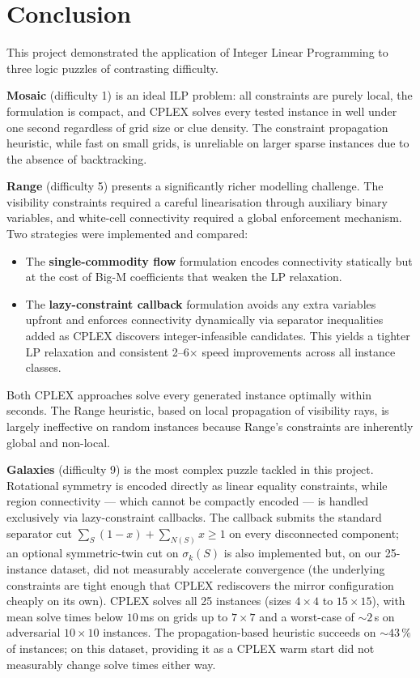 \section{Conclusion}
\label{sec:conclusion}

This project demonstrated the application of Integer Linear Programming to three logic puzzles of contrasting difficulty.

\textbf{Mosaic} (difficulty 1) is an ideal ILP problem: all constraints are purely local, the formulation is compact, and CPLEX solves every tested instance in well under one second regardless of grid size or clue density. The constraint propagation heuristic, while fast on small grids, is unreliable on larger sparse instances due to the absence of backtracking.

\textbf{Range} (difficulty 5) presents a significantly richer modelling challenge. The visibility constraints required a careful linearisation through auxiliary binary variables, and white-cell connectivity required a global enforcement mechanism. Two strategies were implemented and compared:
\begin{itemize}
  \item The \textbf{single-commodity flow} formulation encodes connectivity statically but at the cost of Big-M coefficients that weaken the LP relaxation.
  \item The \textbf{lazy-constraint callback} formulation avoids any extra variables upfront and enforces connectivity dynamically via separator inequalities added as CPLEX discovers integer-infeasible candidates. This yields a tighter LP relaxation and consistent 2--6$\times$ speed improvements across all instance classes.
\end{itemize}
Both CPLEX approaches solve every generated instance optimally within seconds. The Range heuristic, based on local propagation of visibility rays, is largely ineffective on random instances because Range's constraints are inherently global and non-local.

\textbf{Galaxies} (difficulty 9) is the most complex puzzle tackled in this project. Rotational symmetry is encoded directly as linear equality constraints, while region connectivity --- which cannot be compactly encoded --- is handled exclusively via lazy-constraint callbacks. The callback submits the standard separator cut $\sum_{S}(1{-}x) + \sum_{N(S)} x \geq 1$ on every disconnected component; an optional symmetric-twin cut on $\sigma_k(S)$ is also implemented but, on our 25-instance dataset, did not measurably accelerate convergence (the underlying constraints are tight enough that CPLEX rediscovers the mirror configuration cheaply on its own). CPLEX solves all 25 instances (sizes $4 \times 4$ to $15 \times 15$), with mean solve times below $10$\,ms on grids up to $7 \times 7$ and a worst-case of $\sim 2$\,s on adversarial $10 \times 10$ instances. The propagation-based heuristic succeeds on $\sim 43\,\%$ of instances; on this dataset, providing it as a CPLEX warm start did not measurably change solve times either way.

